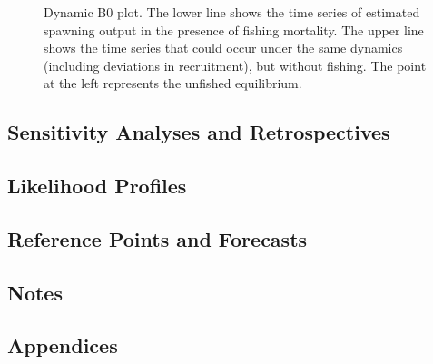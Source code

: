 \documentclass[
]{scrartcl}
\begin{document}
\begin{figure}[H]


\caption{\label{fig-dyn-b0}Dynamic B0 plot. The lower line shows the
time series of estimated spawning output in the presence of fishing
mortality. The upper line shows the time series that could occur under
the same dynamics (including deviations in recruitment), but without
fishing. The point at the left represents the unfished equilibrium.}

\end{figure}%

\newpage

\subsection{Sensitivity Analyses and
Retrospectives}\label{sensitivity-analyses-and-retrospectives}

\newpage

\subsection{Likelihood Profiles}\label{likelihood-profiles-1}

\newpage

\subsection{Reference Points and
Forecasts}\label{reference-points-and-forecasts}

\newpage

\newpage{}

\subsection{Notes}\label{notes}

\newpage{}

\subsection{Appendices}\label{sec-appendix}
\end{document}

